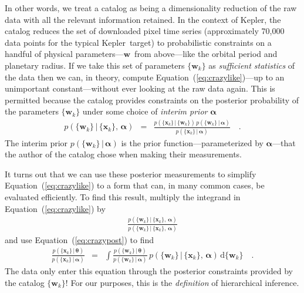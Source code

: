 \documentclass[12pt,preprint]{aastex}
\newcommand{\project}[1]{{\sffamily #1}}
\newcommand{\kepler}{\project{Kepler}}
\newcommand{\Eq}[1]{Equation~(\ref{eq:#1})}
\newcommand{\eq}[1]{\Eq{#1}}
\newcommand{\eqlabel}[1]{\label{eq:#1}}
\newcommand{\dd}{\ensuremath{\,\mathrm{d}}}
\newcommand{\bvec}[1]{\ensuremath{\boldsymbol{#1}}}
\newcommand{\ratepar}{{\ensuremath{\theta}}}
\newcommand{\ratepars}{{\ensuremath{\bvec{\ratepar}}}}
\newcommand{\data}{{\ensuremath{\bvec{x}}}}
\newcommand{\entry}{{\ensuremath{\bvec{w}}}}
\newcommand{\interim}{{\ensuremath{\bvec{\alpha}}}}
\begin{document}
In other words, we treat a catalog as being a dimensionality reduction of the
raw data with all the relevant information retained.
In the context of \kepler, the catalog reduces the set of downloaded pixel
time series (approximately 70,000 data points for the typical \kepler\ target)
to probabilistic constraints on a handful of physical parameters---\entry\
from above---like the orbital period and planetary radius.
If we take this set of parameters $\{\entry_k\}$ as \emph{sufficient
statistics} of the data then we can, in theory, compute \eq{crazylike}---up to
an unimportant constant---without ever looking at the raw data again.
This is permitted because the catalog provides constraints on the posterior
probability of the parameters $\{\entry_k\}$ under some choice of
\emph{interim prior} \interim
\begin{eqnarray}\eqlabel{crazypost}
p(\{\entry_k\}\,|\,\{\data_k\},\,\interim) &=&
\frac{p(\{\data_k\}\,|\,\{\entry_k\})\,p(\{\entry_k\}\,|\,\interim)}
     {p(\{\data_k\}\,|\,\interim)} \quad.
\end{eqnarray}
The interim prior $p(\{\entry_k\}\,|\,\interim)$ is the prior
function---parameterized by \interim---that the author of the catalog chose
when making their measurements.

It turns out that we can use these posterior measurements to simplify
\eq{crazylike} to a form that can, in many common cases, be evaluated
efficiently.
To find this result, multiply the integrand in \eq{crazylike} by
\begin{eqnarray}
\frac{p(\{\entry_k\}\,|\,\{\data_k\},\,\interim)}
     {p(\{\entry_k\}\,|\,\{\data_k\},\,\interim)}
\end{eqnarray}
and use \eq{crazypost} to find
\begin{eqnarray}\eqlabel{simplemarglike}
\frac{p(\{\data_k\}\,|\,\ratepars)}{p(\{\data_k\}\,|\,\interim)} &=&
    \int
    \frac{p(\{\entry_k\}\,|\,\ratepars)}{p(\{\entry_k\}\,|\,\interim)}\,
    p(\{\entry_k\}\,|\,\{\data_k\},\,\interim)
    \dd\{\entry_k\} \quad.
\end{eqnarray}
The data only enter this equation through the posterior constraints provided
by the catalog $\{\entry_k\}$!
For our purposes, this is the \emph{definition} of hierarchical inference.
\end{document}
